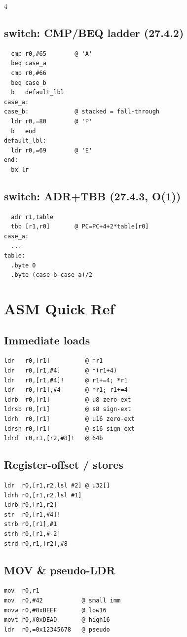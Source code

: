 \documentclass[8pt,landscape]{extarticle}
\begin{document}
\begin{multicols*}{4}
\subsection{switch: CMP/BEQ ladder (27.4.2)}
\begin{lstlisting}
  cmp r0,#65        @ 'A'
  beq case_a
  cmp r0,#66
  beq case_b
  b   default_lbl
case_a:
case_b:             @ stacked = fall-through
  ldr r0,=80        @ 'P'
  b   end
default_lbl:
  ldr r0,=69        @ 'E'
end:
  bx lr
\end{lstlisting}

\subsection{switch: ADR+TBB (27.4.3, O(1))}
\begin{lstlisting}
  adr r1,table
  tbb [r1,r0]       @ PC=PC+4+2*table[r0]
case_a:
  ...
table:
  .byte 0
  .byte (case_b-case_a)/2
\end{lstlisting}

\section{ASM Quick Ref}

\subsection{Immediate loads}
\begin{lstlisting}
ldr   r0,[r1]          @ *r1
ldr   r0,[r1,#4]       @ *(r1+4)
ldr   r0,[r1,#4]!      @ r1+=4; *r1
ldr   r0,[r1],#4       @ *r1; r1+=4
ldrb  r0,[r1]          @ u8 zero-ext
ldrsb r0,[r1]          @ s8 sign-ext
ldrh  r0,[r1]          @ u16 zero-ext
ldrsh r0,[r1]          @ s16 sign-ext
ldrd  r0,r1,[r2,#8]!   @ 64b
\end{lstlisting}

\subsection{Register-offset / stores}
\begin{lstlisting}
ldr  r0,[r1,r2,lsl #2] @ u32[]
ldrh r0,[r1,r2,lsl #1]
ldrb r0,[r1,r2]
str  r0,[r1,#4]!
strb r0,[r1],#1
strh r0,[r1,#-2]
strd r0,r1,[r2],#8
\end{lstlisting}

\subsection{MOV \& pseudo-LDR}
\begin{lstlisting}
mov  r0,r1
mov  r0,#42           @ small imm
movw r0,#0xBEEF       @ low16
movt r0,#0xDEAD       @ high16
ldr  r0,=0x12345678   @ pseudo
\end{lstlisting}


\end{multicols*}
\end{document}
